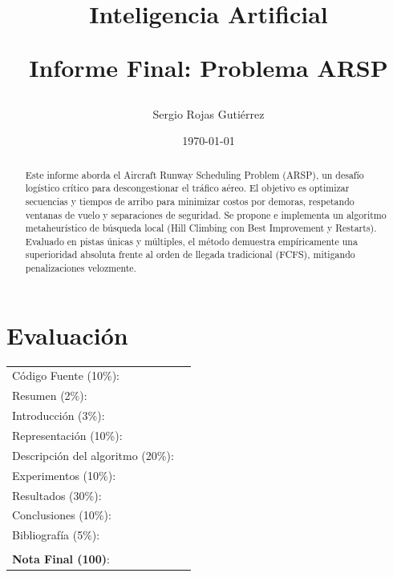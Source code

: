 \documentclass[letter, 10pt]{article}
\begin{document}
\title{Inteligencia Artificial \\ \begin{Large}Informe Final: Problema ARSP\end{Large}}
\author{Sergio Rojas Gutiérrez}
\date{\today}
\maketitle


\section*{Evaluaci\'on}

\begin{tabular}{ll}
Código Fuente (10\%): &  \underline{\hspace{2cm}}\\
Resumen (2\%):  & \underline{\hspace{2cm}} \\
Introducci\'on (3\%):  & \underline{\hspace{2cm}} \\
Representaci\'on (10\%):  & \underline{\hspace{2cm}} \\
Descripci\'on del algoritmo (20\%):  & \underline{\hspace{2cm}} \\
Experimentos (10\%):  & \underline{\hspace{2cm}} \\
Resultados (30\%):  & \underline{\hspace{2cm}} \\
Conclusiones (10\%): &  \underline{\hspace{2cm}}\\
Bibliograf\'ia (5\%): & \underline{\hspace{2cm}}\\
 &  \\
\textbf{Nota Final (100)}:   & \underline{\hspace{2cm}}
\end{tabular}

\begin{abstract}
Este informe aborda el Aircraft Runway Scheduling Problem (ARSP), un desafío logístico crítico para descongestionar el tráfico aéreo. El objetivo es optimizar secuencias y tiempos de arribo para minimizar costos por demoras, respetando ventanas de vuelo y separaciones de seguridad. Se propone e implementa un algoritmo metaheurístico de búsqueda local (Hill Climbing con Best Improvement y Restarts). Evaluado en pistas únicas y múltiples, el método demuestra empíricamente una superioridad absoluta frente al orden de llegada tradicional (FCFS), mitigando penalizaciones velozmente.
\end{abstract}
\end{document}
